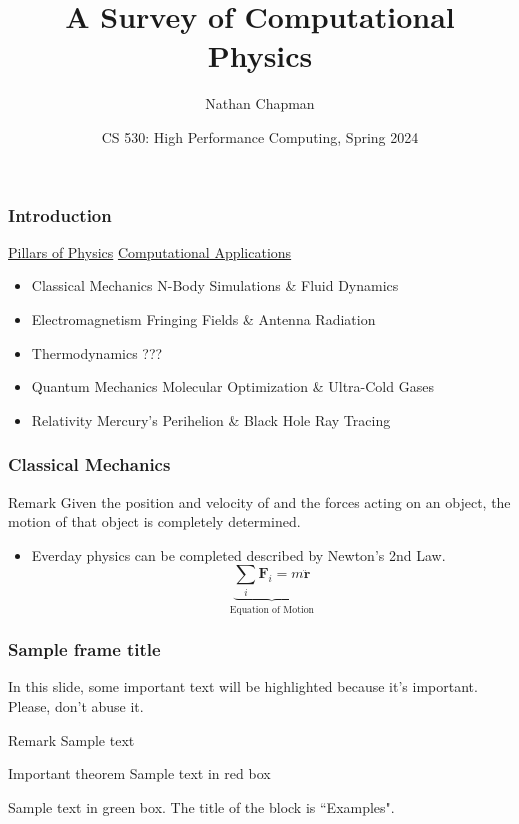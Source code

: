 \documentclass{beamer}
\title[Computational Physics]{A Survey of Computational Physics}
\author[Chapman, Nathan]{Nathan Chapman\inst{1}}
\institute[CWU]
{
  \inst{1}
  Faculty of Physics\\
  Central Washington University
}
\date[HPC 2024]{CS 530: High Performance Computing, Spring 2024}
\begin{document}
\frame{\titlepage}


\begin{frame}
\frametitle{Introduction}
    \hspace{0.25in} \underline{Pillars of Physics} \hfill \underline{Computational Applications}
    \begin{itemize}
        \item <1-> Classical Mechanics \phantom{  } \rightarrowfill \phantom{  } N-Body Simulations \& Fluid Dynamics
        \item <2-> Electromagnetism \phantom{  } \rightarrowfill \phantom{  } Fringing Fields \& Antenna Radiation
        \item <3-> Thermodynamics \phantom{  } \rightarrowfill \phantom{  } ???
        \item <4-> Quantum Mechanics \phantom{  } \rightarrowfill \phantom{  } Molecular Optimization \& Ultra-Cold Gases
        \item <5-> Relativity \phantom{  } \rightarrowfill \phantom{  } Mercury's Perihelion \& Black Hole Ray Tracing
    \end{itemize}
\end{frame}

\begin{frame}
    \frametitle{Classical Mechanics}
    \begin{block}{Remark}
        Given the position and velocity of and the forces acting on an object, the motion of that object is completely determined.
    \end{block}
    \begin{itemize}
        \item Everday physics can be completed described by Newton's 2nd Law.
              \begin{equation} \label{eq:newton}
                  \underbrace{\sum_i \mathbf{F}_i = m \ddot{\mathbf{r}}}_\text{Equation of Motion}
              \end{equation}
    \end{itemize}
\end{frame}

\begin{frame}
    \frametitle{Sample frame title}
    
    In this slide, some important text will be
    \alert{highlighted} because it's important.
    Please, don't abuse it.
    
    \begin{block}{Remark}
    Sample text
    \end{block}
    
    \begin{alertblock}{Important theorem}
    Sample text in red box
    \end{alertblock}
    
    \begin{examples}
    Sample text in green box. The title of the block is ``Examples".
    \end{examples}
\end{frame}
\end{document}
